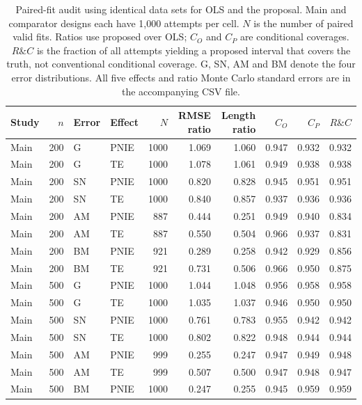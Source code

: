 \begin{table}[htbp]\centering\footnotesize\setlength{\tabcolsep}{4pt}
\caption{Paired-fit audit using identical data sets for OLS and the proposal. Main and comparator designs each have 1,000 attempts per cell. $N$ is the number of paired valid fits. Ratios use proposed over OLS; $C_O$ and $C_P$ are conditional coverages. $R\&C$ is the fraction of all attempts yielding a proposed interval that covers the truth, not conventional conditional coverage. G, SN, AM and BM denote the four error distributions. All five effects and ratio Monte Carlo standard errors are in the accompanying CSV file.}
\label{tab:paired-audit}
\begin{tabular}{lrllrrrrrr}\toprule
Study & $n$ & Error & Effect & $N$ & RMSE ratio & Length ratio & $C_O$ & $C_P$ & $R\&C$ \\
\midrule
Main & 200 & G & PNIE & 1000 & 1.069 & 1.060 & 0.947 & 0.932 & 0.932 \\
Main & 200 & G & TE & 1000 & 1.078 & 1.061 & 0.949 & 0.938 & 0.938 \\
\midrule
Main & 200 & SN & PNIE & 1000 & 0.820 & 0.828 & 0.945 & 0.951 & 0.951 \\
Main & 200 & SN & TE & 1000 & 0.840 & 0.857 & 0.937 & 0.936 & 0.936 \\
\midrule
Main & 200 & AM & PNIE & 887 & 0.444 & 0.251 & 0.949 & 0.940 & 0.834 \\
Main & 200 & AM & TE & 887 & 0.550 & 0.504 & 0.966 & 0.937 & 0.831 \\
\midrule
Main & 200 & BM & PNIE & 921 & 0.289 & 0.258 & 0.942 & 0.929 & 0.856 \\
Main & 200 & BM & TE & 921 & 0.731 & 0.506 & 0.966 & 0.950 & 0.875 \\
\midrule
Main & 500 & G & PNIE & 1000 & 1.044 & 1.048 & 0.956 & 0.958 & 0.958 \\
Main & 500 & G & TE & 1000 & 1.035 & 1.037 & 0.946 & 0.950 & 0.950 \\
\midrule
Main & 500 & SN & PNIE & 1000 & 0.761 & 0.783 & 0.955 & 0.942 & 0.942 \\
Main & 500 & SN & TE & 1000 & 0.802 & 0.822 & 0.948 & 0.944 & 0.944 \\
\midrule
Main & 500 & AM & PNIE & 999 & 0.255 & 0.247 & 0.947 & 0.949 & 0.948 \\
Main & 500 & AM & TE & 999 & 0.507 & 0.500 & 0.947 & 0.948 & 0.947 \\
\midrule
Main & 500 & BM & PNIE & 1000 & 0.247 & 0.255 & 0.945 & 0.959 & 0.959 \\

\end{tabular}
\end{table}
